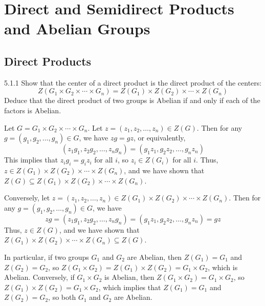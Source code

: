 \section{Direct and Semidirect Products and Abelian Groups}

\subsection{Direct Products}

\begin{exercise}{5.1.1}
    Show that the center of a direct product is the direct product of the centers:
    \[
    	Z(G_1 \times G_2 \times \cdots \times G_n) = Z(G_1) \times Z(G_2) \times \cdots \times Z(G_n)
    \]
    Deduce that the direct product of two groups is Abelian if and only if each of the factors is Abelian.
\end{exercise}

\begin{sol}
    Let $G = G_1 \times G_2 \times \cdots \times G_n$.
	Let $z = (z_1, z_2, \ldots, z_n) \in Z(G)$.
	Then for any $g = (g_1, g_2, \ldots, g_n) \in G$, we have $zg = gz$, or equivalently,
    \[
    	(z_1g_1, z_2g_2, \ldots, z_ng_n) = (g_1z_1, g_2z_2, \ldots, g_nz_n)
    \]
    This implies that $z_i g_i = g_i z_i$ for all $i$, so $z_i \in Z(G_i)$ for all $i$.
	Thus, $z \in Z(G_1) \times Z(G_2) \times \cdots \times Z(G_n)$, and we have shown that $Z(G) \subseteq Z(G_1) \times Z(G_2) \times \cdots \times Z(G_n)$.

    Conversely, let $z = (z_1, z_2, \ldots, z_n) \in Z(G_1) \times Z(G_2) \times \cdots \times Z(G_n)$.
	Then for any $g = (g_1, g_2, \ldots, g_n) \in G$, we have
    \[
    	zg = (z_1g_1, z_2g_2, \ldots, z_ng_n) = (g_1z_1, g_2z_2, \ldots, g_nz_n) = gz
    \]
    Thus, $z \in Z(G)$, and we have shown that $Z(G_1) \times Z(G_2) \times \cdots \times Z(G_n) \subseteq Z(G)$.

    In particular, if two groups $G_1$ and $G_2$ are Abelian, then $Z(G_1) = G_1$ and $Z(G_2) = G_2$, so $Z(G_1 \times G_2) = Z(G_1) \times Z(G_2) = G_1 \times G_2$, which is Abelian.
    Conversely, if $G_1 \times G_2$ is Abelian, then $Z(G_1 \times G_2) = G_1 \times G_2$, so $Z(G_1) \times Z(G_2) = G_1 \times G_2$, which implies that $Z(G_1) = G_1$ and $Z(G_2) = G_2$, so both $G_1$ and $G_2$ are Abelian.
\end{sol}

